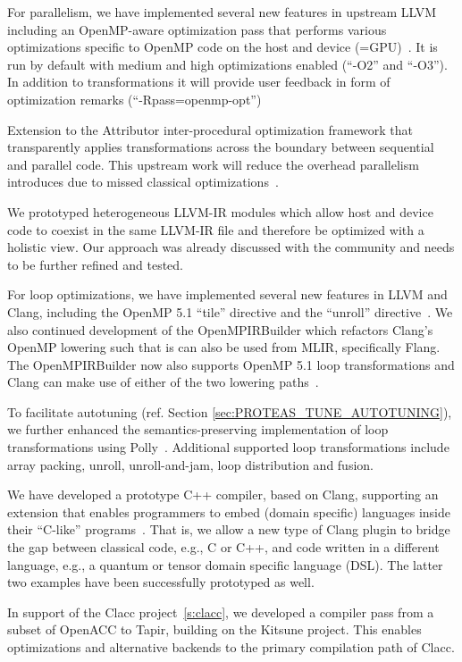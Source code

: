 For parallelism, we have implemented several new features in upstream LLVM
including an OpenMP-aware optimization pass that performs various optimizations
specific to OpenMP code on the host and device (=GPU)~\cite{OpenMPOpt2020}. It
is run by default with medium and high optimizations enabled (``-O2'' and
``-O3''). In addition to transformations it will provide user feedback in form
of optimization remarks (``-Rpass=openmp-opt'')

Extension to the Attributor inter-procedural optimization framework that
transparently applies transformations across the  boundary between sequential
and parallel code. This upstream work will reduce the overhead parallelism
introduces due to missed classical optimizations~\cite{giorgis2020}.

We prototyped heterogeneous LLVM-IR modules which allow host and device code to
coexist in the same LLVM-IR file and therefore be optimized with a holistic
view. Our approach was already discussed with the community and needs to be
further refined and tested.

For loop optimizations, we have implemented several new features in LLVM and
Clang, including the OpenMP 5.1 ``tile'' directive and the ``unroll'' directive~\cite{kruse2021openmpbooth}.
We also continued development of the OpenMPIRBuilder which refactors Clang's OpenMP lowering such that is can also be used from MLIR, specifically Flang.
The OpenMPIRBuilder now also supports OpenMP 5.1 loop transformations and Clang can make use of either of the two lowering paths~\cite{kruse2021clangast}.

To facilitate autotuning (ref. Section \ref{sec:PROTEAS_TUNE_AUTOTUNING}), we further
enhanced the semantics-preserving implementation of loop transformations using Polly~\cite{wu2021autotuning}.
Additional supported loop transformations include array packing, unroll, unroll-and-jam, loop distribution and fusion.

We have developed a prototype C++ compiler, based on Clang, supporting an
extension that enables programmers to embed (domain specific) languages inside
their ``C-like'' programs~\cite{finkel2020dsl}. That is, we allow a new type of
Clang plugin to bridge the gap between classical code, e.g., C or C++, and code
written in a different language, e.g., a quantum or tensor domain specific
language (DSL). The latter two examples have been successfully prototyped as
well.

In support of the Clacc project~\ref{s:clacc}, we developed a compiler
pass from a subset of OpenACC to Tapir, building on the Kitsune
project. This enables optimizations and alternative backends to the
primary compilation path of Clacc.


